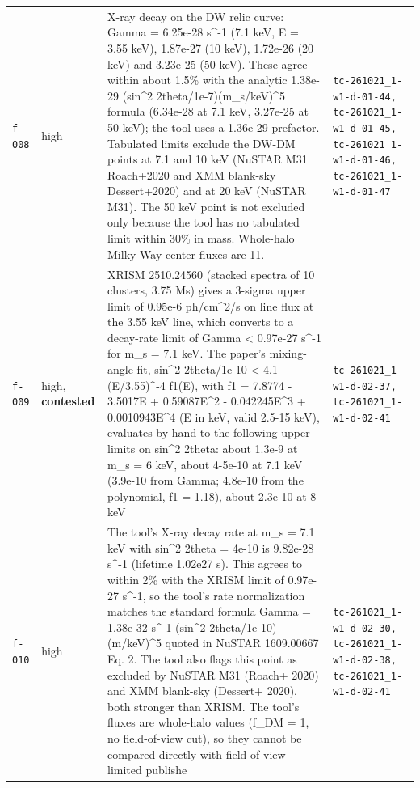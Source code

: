 \documentclass[11pt,a4paper]{article}
\begin{document}
\begin{longtable}{@{}p{}p{}p{}p{}@{}}
\texttt{f-008} & high & X-ray decay on the DW relic curve: Gamma = 6.25e-28 s\textasciicircum{}-1 (7.1 keV, E = 3.55 keV), 1.87e-27 (10 keV), 1.72e-26 (20 keV) and 3.23e-25 (50 keV). These agree within about 1.5\% with the analytic 1.38e-29 (sin\textasciicircum{}2 2theta/1e-7)(m\_s/keV)\textasciicircum{}5 formula (6.34e-28 at 7.1 keV, 3.27e-25 at 50 keV); the tool uses a 1.36e-29 prefactor. Tabulated limits exclude the DW-DM points at 7.1 and 10 keV (NuSTAR M31 Roach+2020 and XMM blank-sky Dessert+2020) and at 20 keV (NuSTAR M31). The 50 keV point is not excluded only because the tool has no tabulated limit within 30\% in mass. Whole-halo Milky Way-center fluxes are 11. & \texttt{tc-261021\_\allowbreak{}1-w1-d-01-44,\allowbreak{} tc-261021\_\allowbreak{}1-w1-d-01-45,\allowbreak{} tc-261021\_\allowbreak{}1-w1-d-01-46,\allowbreak{} tc-261021\_\allowbreak{}1-w1-d-01-47} \\
\texttt{f-009} & high, \textbf{contested} & XRISM 2510.24560 (stacked spectra of 10 clusters, 3.75 Ms) gives a 3-sigma upper limit of 0.95e-6 ph/cm\textasciicircum{}2/s on line flux at the 3.55 keV line, which converts to a decay-rate limit of Gamma \textless{} 0.97e-27 s\textasciicircum{}-1 for m\_s = 7.1 keV. The paper's mixing-angle fit, sin\textasciicircum{}2 2theta/1e-10 \textless{} 4.1 (E/3.55)\textasciicircum{}-4 f1(E), with f1 = 7.8774 - 3.5017E + 0.59087E\textasciicircum{}2 - 0.042245E\textasciicircum{}3 + 0.0010943E\textasciicircum{}4 (E in keV, valid 2.5-15 keV), evaluates by hand to the following upper limits on sin\textasciicircum{}2 2theta: about 1.3e-9 at m\_s = 6 keV, about 4-5e-10 at 7.1 keV (3.9e-10 from Gamma; 4.8e-10 from the polynomial, f1 = 1.18), about 2.3e-10 at 8 keV & \texttt{tc-261021\_\allowbreak{}1-w1-d-02-37,\allowbreak{} tc-261021\_\allowbreak{}1-w1-d-02-41} \\
\texttt{f-010} & high & The tool's X-ray decay rate at m\_s = 7.1 keV with sin\textasciicircum{}2 2theta = 4e-10 is 9.82e-28 s\textasciicircum{}-1 (lifetime 1.02e27 s). This agrees to within 2\% with the XRISM limit of 0.97e-27 s\textasciicircum{}-1, so the tool's rate normalization matches the standard formula Gamma = 1.38e-32 s\textasciicircum{}-1 (sin\textasciicircum{}2 2theta/1e-10)(m/keV)\textasciicircum{}5 quoted in NuSTAR 1609.00667 Eq. 2. The tool also flags this point as excluded by NuSTAR M31 (Roach+ 2020) and XMM blank-sky (Dessert+ 2020), both stronger than XRISM. The tool's fluxes are whole-halo values (f\_DM = 1, no field-of-view cut), so they cannot be compared directly with field-of-view-limited publishe & \texttt{tc-261021\_\allowbreak{}1-w1-d-02-30,\allowbreak{} tc-261021\_\allowbreak{}1-w1-d-02-38,\allowbreak{} tc-261021\_\allowbreak{}1-w1-d-02-41} \\

\end{longtable}
\end{document}
